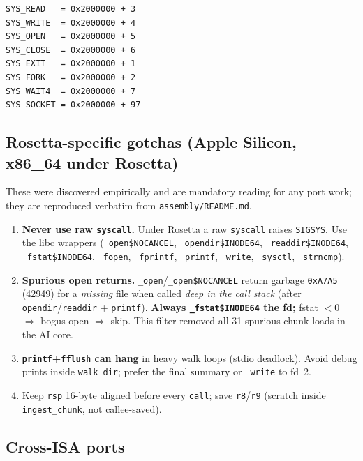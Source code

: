 \begin{lstlisting}[language=SakumAsm,caption={Syscall bases (sakum\_pipe.s:34, sakum\_bramann.s).}]
SYS_READ   = 0x2000000 + 3
SYS_WRITE  = 0x2000000 + 4
SYS_OPEN   = 0x2000000 + 5
SYS_CLOSE  = 0x2000000 + 6
SYS_EXIT   = 0x2000000 + 1
SYS_FORK   = 0x2000000 + 2
SYS_WAIT4  = 0x2000000 + 7
SYS_SOCKET = 0x2000000 + 97
\end{lstlisting}

\subsection{Rosetta-specific gotchas (Apple Silicon, x86\_64 under Rosetta)}
\label{sec:rosetta}

These were discovered empirically and are mandatory reading for any port
work; they are reproduced verbatim from \texttt{assembly/README.md}.

\begin{enumerate}[label=R\arabic*.]
\item \textbf{Never use raw \texttt{syscall}.} Under Rosetta a raw
  \texttt{syscall} raises \texttt{SIGSYS}.  Use the libc wrappers
  (\texttt{\_open\$NOCANCEL}, \texttt{\_opendir\$INODE64},
  \texttt{\_readdir\$INODE64}, \texttt{\_fstat\$INODE64}, \texttt{\_fopen},
  \texttt{\_fprintf}, \texttt{\_printf}, \texttt{\_write},
  \texttt{\_sysctl}, \texttt{\_strncmp}).
\item \textbf{Spurious open returns.} \texttt{\_open}/\texttt{\_open\$NOCANCEL}
  return garbage \texttt{0xA7A5} (42949) for a \emph{missing} file when
  called \emph{deep in the call stack} (after \texttt{opendir}/\texttt{readdir}
  + \texttt{printf}).  \textbf{Always \texttt{\_fstat\$INODE64} the fd;}
  fstat $< 0$ $\Rightarrow$ bogus open $\Rightarrow$ skip.  This filter
  removed all 31 spurious chunk loads in the AI core.
\item \textbf{\texttt{printf}+\texttt{fflush} can hang} in heavy walk loops
  (stdio deadlock).  Avoid debug prints inside \texttt{walk\_dir}; prefer
  the final summary or \texttt{\_write} to fd~2.
\item Keep \texttt{rsp} 16-byte aligned before every \texttt{call}; save
  \texttt{r8}/\texttt{r9} (scratch inside \texttt{ingest\_chunk}, not
  callee-saved).
\end{enumerate}

\subsection{Cross-ISA ports}

